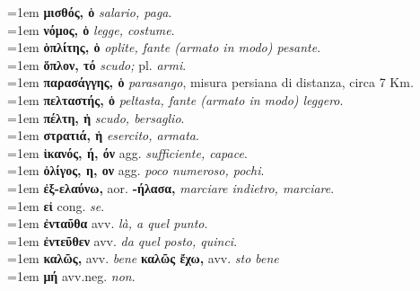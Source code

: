 \documentclass[nols]{tufte-handout}
\begin{document}
\begin{multicols}{2}
    \noindent \hangindent=1em \textbf{μισθός, ὁ} \textit{salario, paga}.  \\
    \noindent \hangindent=1em \textbf{νόμος, ὁ} \textit{legge, costume}.  \\
    \noindent \hangindent=1em \textbf{ὁπλίτης, ὁ} \textit{oplite, fante (armato in modo) pesante}.  \\
    \noindent \hangindent=1em \textbf{ὅπλον, τό} \textit{scudo;} pl. \textit{armi}.  \\
    \noindent \hangindent=1em \textbf{παρασάγγης, ὁ} \textit{parasango}, misura persiana di distanza, circa 7 Km.  \\
    \noindent \hangindent=1em \textbf{πελταστής, ὁ} \textit{peltasta, fante (armato in modo) leggero}.  \\
    \noindent \hangindent=1em \textbf{πέλτη, ἡ} \textit{scudo, bersaglio}.  \\
    \noindent \hangindent=1em \textbf{στρατιά, ἡ} \textit{esercito, armata}.  \\
    
	\noindent \hangindent=1em \textbf{ἱκανός, ή, όν} agg. \textit{sufficiente, capace}.  \\
	\noindent \hangindent=1em \textbf{ὀλίγος, η, ον} agg.  \textit{poco numeroso, pochi}.  \\
	
	\noindent \hangindent=1em \textbf{ἐξ-ελαύνω,} aor. \textbf{-ήλασα,} \textit{marciare indietro, marciare}. \\ 
	\noindent \hangindent=1em \textbf{εἰ} cong. \textit{se}.  \\
	
	\noindent \hangindent=1em \textbf{ἐνταῦθα} avv. \textit{là, a quel punto}.  \\
	\noindent \hangindent=1em \textbf{ἐντεῦθεν} avv. \textit{da quel posto, quinci}.  \\
	
	\noindent \hangindent=1em \textbf{καλῶς,} avv. \textit{bene}  \textbf{καλῶς ἔχω,} avv. \textit{sto bene} \\
	\noindent \hangindent=1em \textbf{μή} avv.neg. \textit{non}.
	
\end{multicols}

\end{document}
